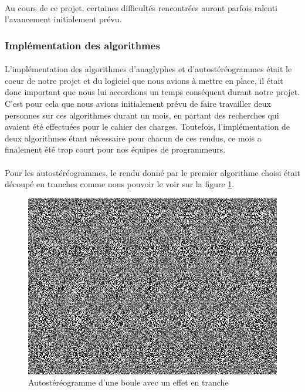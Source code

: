 \paragraph{}
Au cours de ce projet, certaines difficultés rencontrées auront parfois ralenti l'avancement initialement prévu.

\subsubsection{Implémentation des algorithmes}
\paragraph{}
L'implémentation des algorithmes d'anaglyphes et d'autostéréogrammes était le coeur de notre projet et du logiciel que nous avions à mettre en place, il était donc important que nous lui accordions un temps conséquent durant notre projet. C'est pour cela que nous avions initialement prévu de faire travailler deux personnes sur ces algorithmes durant un mois, en partant des recherches qui avaient été effectuées pour le cahier des charges. Toutefois, l'implémentation de deux algorithmes étant nécessaire pour chacun de ces rendus, ce mois a finalement été trop court pour nos équipes de programmeurs.

\paragraph{}
Pour les autostéréogrammes, le rendu donné par le premier algorithme choisi était découpé en tranches comme nous pouvoir le voir sur la figure \ref{fig:sphAutoste}.

\begin{figure}[h]               
	\centering      
	\includegraphics[scale=0.7]{bouleAutoste.png}
	\caption{\label{fig:sphAutoste} Autostéréogramme d'une boule avec un effet en tranche \protect}
\end{figure}

